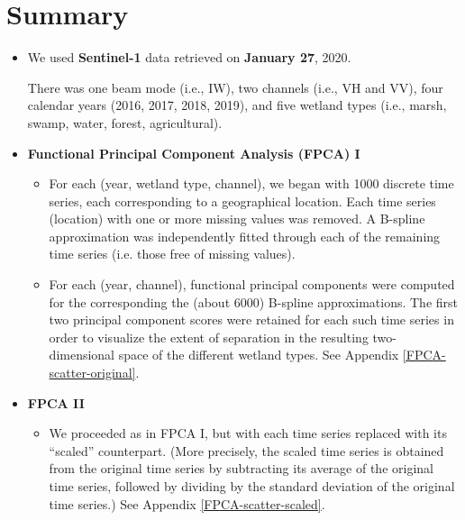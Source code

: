 
\section{Summary}
\setcounter{theorem}{0}

\renewcommand{\theenumi}{\roman{enumi}}
\renewcommand{\labelenumi}{\textnormal{(\theenumi)}$\;\;$}


\begin{itemize}
\item
	We used \textbf{\color{red}Sentinel-1} data retrieved on \textbf{\color{red}January 27}, 2020.

	There was one beam mode (i.e., IW), two channels (i.e., VH and VV),
	four calendar years (2016, 2017, 2018, 2019), and
	five wetland types (i.e., marsh, swamp, water, forest, agricultural).

\item
	\textbf{Functional Principal Component Analysis (FPCA) I}
	\begin{itemize}
	\item
		For each (year, wetland type, channel), we began with 1000 discrete time series,
		each corresponding to a geographical location.
		Each time series (location) with one or more missing values was removed.
		A B-spline approximation was independently fitted through each of the remaining time series
		(i.e. those free of missing values).
	\item
		For each (year, channel), functional principal components were computed for the
		corresponding the (about 6000) B-spline approximations.
		The first two principal component scores were retained for each such time series
		in order to visualize the extent of separation in the resulting two-dimensional space
		of the different wetland types. See Appendix \ref{FPCA-scatter-original}.
	\end{itemize}

\item
	\textbf{FPCA II}
	\begin{itemize}
	\item
		We proceeded as in FPCA I, but with each time series replaced
		with its ``scaled'' counterpart.
		(More precisely, the scaled time series is obtained from the original time series
		by subtracting its average of the original time series, followed by
		dividing by the standard deviation of the original time series.)
		See Appendix \ref{FPCA-scatter-scaled}.
	\end{itemize}


\end{itemize}
